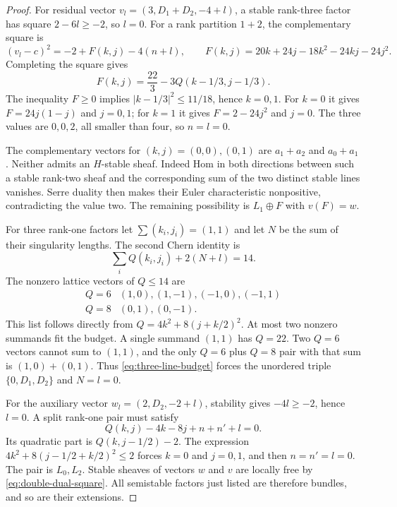 \begin{proof}
For residual vector $v_l=(3,D_1+D_2,-4+l)$, a stable
rank-three factor has square $2-6l\ge-2$, so $l=0$.
For a rank partition $1+2$, the complementary square is
\begin{equation}\label{eq:interacting-bound}
 (v_l-c)^2=-2+F(k,j)-4(n+l),\qquad
 F(k,j)=20k+24j-18k^2-24kj-24j^2.
\end{equation}
Completing the square gives
\[
 F(k,j)=\frac{22}{3}-3Q(k-1/3,j-1/3).
\]
The inequality $F\ge0$ implies
$|k-1/3|^2\le11/18$, hence $k=0,1$.
For $k=0$ it gives $F=24j(1-j)$ and $j=0,1$;
for $k=1$ it gives $F=2-24j^2$ and $j=0$.
The three values are $0,0,2$, all smaller than four, so
$n=l=0$.

The complementary vectors for $(k,j)=(0,0),(0,1)$ are
$a_1+a_2$ and $a_0+a_1$. Neither admits an $H$-stable
sheaf. Indeed Hom in both directions between such a
stable rank-two sheaf and the corresponding sum of the
two distinct stable lines vanishes. Serre duality then
makes their Euler characteristic nonpositive, contradicting
the value two. The remaining possibility is $L_1\oplus F$
with $v(F)=w$.

For three rank-one factors let
$\sum(k_i,j_i)=(1,1)$ and let $N$ be the sum of their
singularity lengths. The second Chern identity is
\begin{equation}\label{eq:three-line-budget}
 \sum_i Q(k_i,j_i)+2(N+l)=14.
\end{equation}
The nonzero lattice vectors of $Q\le14$ are
\[
 \begin{array}{c|c}
 Q=6&(1,0),(1,-1),(-1,0),(-1,1)\\
 Q=8&(0,1),(0,-1).
 \end{array}
\]
This list follows directly from $Q=4k^2+8(j+k/2)^2$.
At most two nonzero summands fit the budget. A single
summand $(1,1)$ has $Q=22$. Two $Q=6$ vectors cannot
sum to $(1,1)$, and the only $Q=6$ plus $Q=8$ pair
with that sum is $(1,0)+(0,1)$. Thus
\eqref{eq:three-line-budget} forces the unordered triple
$\{0,D_1,D_2\}$ and $N=l=0$.

For the auxiliary vector $w_l=(2,D_2,-2+l)$,
stability gives $-4l\ge-2$, hence $l=0$. A split
rank-one pair must satisfy
\[
 Q(k,j)-4k-8j+n+n'+l=0.
\]
Its quadratic part is $Q(k,j-1/2)-2$. The expression
$4k^2+8(j-1/2+k/2)^2\le2$ forces $k=0$ and
$j=0,1$, and then $n=n'=l=0$. The pair is
$L_0,L_2$. Stable sheaves of vectors $w$ and $v$
are locally free by \eqref{eq:double-dual-square}.
All semistable factors just listed are therefore bundles,
and so are their extensions.
\end{proof}

